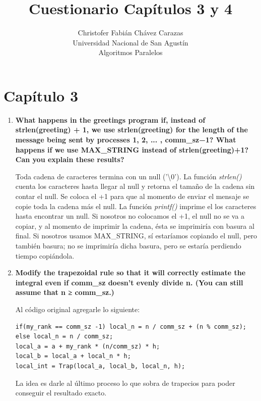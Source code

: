 \documentclass[a4paper,12pt]{article}
\begin{document}
\title{Cuestionario Capítulos 3 y 4}
\author{
Christofer Fabián Chávez Carazas \\
\small{Universidad Nacional de San Agustín} \\
\small{Algoritmos Paralelos}
}

\maketitle

\section{Capítulo 3}

\begin{enumerate}
\item \textbf{What happens in the greetings program if, instead of strlen(greeting) + 1,
we use strlen(greeting) for the length of the message being sent by processes 1, 2, ... , comm\_sz−1?
What happens if we use MAX\_STRING instead of strlen(greeting)+1? Can you explain these results?}

Toda cadena de caracteres termina con un null ('\textbackslash 0'). La función \textit{strlen()} cuenta los caracteres hasta llegar
al null y retorna el tamaño de la cadena sin contar el null. Se coloca el +1 para que al momento de enviar el mensaje se copie
toda la cadena más el null. La función \textit{printf()} imprime el los caracteres hasta encontrar un null. Si nosotros
no colocamos el +1, el null no se va a copiar, y al momento de imprimir la cadena, ésta se imprimiría con basura al final.
Si nosotros usamos MAX\_STRING, sí estaríamos copiando el null, pero también basura; no se imprimiría dicha basura, pero se
estaría perdiendo tiempo copiándola.

\item \textbf{Modify the trapezoidal rule so that it will correctly estimate the integral 
even if comm\_sz doesn’t evenly divide n. (You can still assume that n ≥ comm\_sz.)}

Al código original agregarle lo siguiente:

\begin{lstlisting}
if(my_rank == comm_sz -1) local_n = n / comm_sz + (n % comm_sz);
else local_n = n / comm_sz;
local_a = a + my_rank * (n/comm_sz) * h;
local_b = local_a + local_n * h;
local_int = Trap(local_a, local_b, local_n, h);
\end{lstlisting}

La idea es darle al último proceso lo que sobra de trapecios para poder conseguir el resultado exacto.


\end{enumerate}
\end{document}
